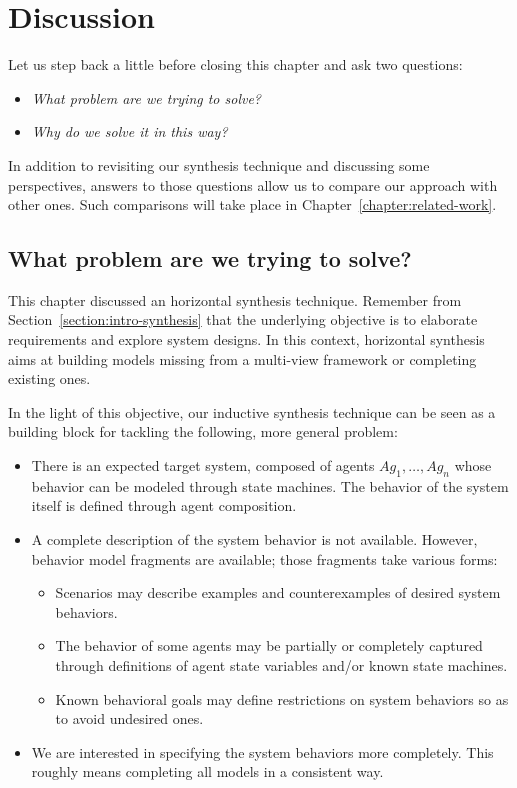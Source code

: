 \section{Discussion\label{section:inductive-discussion}}

Let us step back a little before closing this chapter and ask two questions:
\begin{itemize}
\item \emph{What problem are we trying to solve?}
\item \emph{Why do we solve it in this way?}
\end{itemize}
In addition to revisiting our synthesis technique and discussing some perspectives, answers to those questions allow us to compare our approach with other ones. Such comparisons will take place in Chapter~\ref{chapter:related-work}.

\subsection{What problem are we trying to solve?}

This chapter discussed an horizontal synthesis technique. Remember from Section~\ref{section:intro-synthesis} that the underlying objective is to elaborate requirements and explore system designs. In this context, horizontal synthesis aims at building models missing from a multi-view framework or completing existing ones.

In the light of this objective, our inductive synthesis technique can be seen as a building block for tackling the following, more general problem:
\begin{itemize}
\item There is an expected target system, composed of agents $Ag_1, \ldots, Ag_n$ whose behavior can be modeled through state machines. The behavior of the system itself is defined through agent composition.
\item A complete description of the system behavior is not available. However, behavior model fragments are available; those fragments take various forms:
\begin{itemize}
\item Scenarios may describe examples and counterexamples of desired system behaviors.
\item The behavior of some agents may be partially or completely captured through definitions of agent state variables and/or known state machines.
\item Known behavioral goals may define restrictions on system behaviors so as to avoid undesired ones.
\end{itemize}
\item We are interested in specifying the system behaviors more completely. This roughly means completing all models in a consistent way.
\end{itemize}

